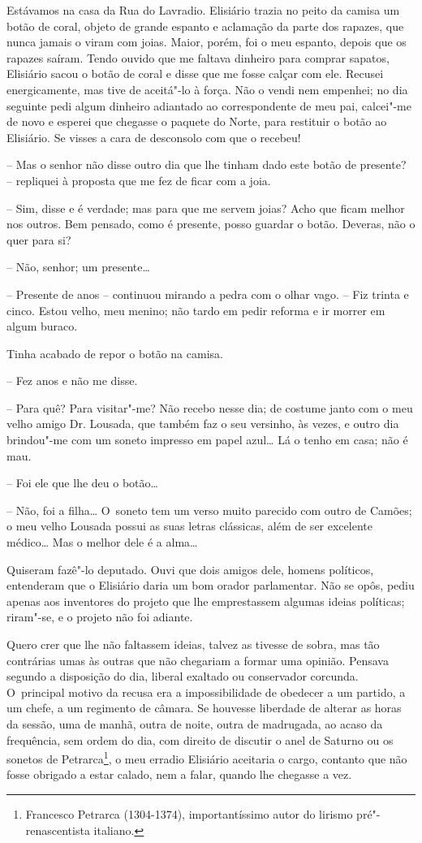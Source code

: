 Estávamos na casa da Rua do Lavradio. Elisiário trazia no peito da
camisa um botão de coral, objeto de grande espanto e aclamação da parte
dos rapazes, que nunca jamais o viram com joias. Maior, porém, foi o meu
espanto, depois que os rapazes saíram. Tendo ouvido que me faltava
dinheiro para comprar sapatos, Elisiário sacou o botão de coral e disse
que me fosse calçar com ele. Recusei energicamente, mas tive de
aceitá"-lo à força. Não o vendi nem empenhei; no dia seguinte pedi algum
dinheiro adiantado ao correspondente de meu pai, calcei"-me de novo e
esperei que chegasse o paquete do Norte, para restituir o botão ao
Elisiário. Se visses a cara de desconsolo com que o recebeu!

-- Mas o senhor não disse outro dia que lhe tinham dado este botão de
presente? -- repliquei à proposta que me fez de ficar com a joia.

-- Sim, disse e é verdade; mas para que me servem joias? Acho que ficam
melhor nos outros. Bem pensado, como é presente, posso guardar o botão.
Deveras, não o quer para si?

-- Não, senhor; um presente\ldots{}

-- Presente de anos -- continuou mirando a pedra com o olhar vago. --
Fiz trinta e cinco. Estou velho, meu menino; não tardo em pedir reforma
e ir morrer em algum buraco.

Tinha acabado de repor o botão na camisa.

-- Fez anos e não me disse.

-- Para quê? Para visitar"-me? Não recebo nesse dia; de costume janto com
o meu velho amigo Dr. Lousada, que também faz o seu versinho, às vezes,
e outro dia brindou"-me com um soneto impresso em papel azul\ldots{} Lá o
tenho em casa; não é mau.

-- Foi ele que lhe deu o botão\ldots{}

-- Não, foi a filha\ldots{} O~soneto tem um verso muito parecido com outro de
Camões; o meu velho Lousada possui as suas letras clássicas, além de ser
excelente médico\ldots{} Mas o melhor dele é a alma\ldots{}

Quiseram fazê"-lo deputado. Ouvi que dois amigos dele, homens políticos,
entenderam que o Elisiário daria um bom orador parlamentar. Não se opôs,
pediu apenas aos inventores do projeto que lhe emprestassem algumas
ideias políticas; riram"-se, e o projeto não foi adiante.

Quero crer que lhe não faltassem ideias, talvez as tivesse de sobra, mas
tão contrárias umas às outras que não chegariam a formar uma opinião.
Pensava segundo a disposição do dia, liberal exaltado ou conservador
corcunda. O~principal motivo da recusa era a impossibilidade de obedecer
a um partido, a um chefe, a um regimento de câmara. Se houvesse
liberdade de alterar as horas da sessão, uma de manhã, outra de noite,
outra de madrugada, ao acaso da frequência, sem ordem do dia, com
direito de discutir o anel de Saturno ou os sonetos de
Petrarca\footnote{Francesco Petrarca (1304-1374), importantíssimo autor
  do lirismo pré"-renascentista italiano.}, o meu erradio Elisiário
aceitaria o cargo, contanto que não fosse obrigado a estar calado, nem a
falar, quando lhe chegasse a vez.

